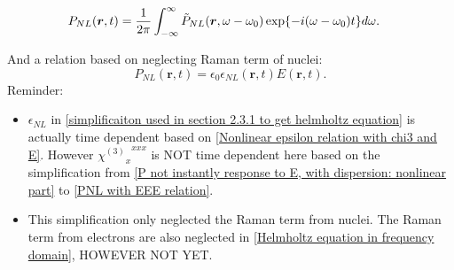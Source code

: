 \documentclass[12pt]{extarticle}
\numberwithin{equation}{section}
\numberwithin{figure}{section}
\numberwithin{table}{section}
\newcommand{\<}{\langle}
\renewcommand{\>}{\rangle}
\theoremstyle{definition}
\newcommand{\SubItem}[1]{
    {\setlength\itemindent{15pt} \item[-] #1}
}
\begin{document}
\begin{itemize}
{\begin{subequations}
\begin{align}
                        &P_{NL}(\boldsymbol{r},t)=\frac{1}{2\pi}\int_{-\infty}^{\infty}\Tilde{P}_{NL}(\boldsymbol{r},\omega-\omega_0)\exp{-i(\omega-\omega_0)t}d\omega. \label{inverse fourier transform of slow oscillating term of PNL}
                    \end{align}
                    \end{subequations}
                    }
                    \SubItem{
                    And a relation based on neglecting Raman term of nuclei:
                    \begin{equation}
                        P_{NL}(\boldsymbol{r},t)= \epsilon_0 \epsilon_{NL}(\boldsymbol{r},t) E(\boldsymbol{r},t).
                    \label{simplificaiton used in section 2.3.1 to get helmholtz equation}
                    \end{equation}
                    Reminder: 
                    \begin{itemize}
                        \item $\epsilon_{NL}$ in \autoref{simplificaiton used in section 2.3.1 to get helmholtz equation} is actually time dependent based on \autoref{Nonlinear epsilon relation with chi3 and E}. However ${{\chi^{(3)}}_x}^{xxx}$ is NOT time dependent here based on the simplification from \autoref{P not instantly response to E, with dispersion: nonlinear part} to \autoref{PNL with EEE relation}.
                        \item This simplification only neglected the Raman term from nuclei. The Raman term from electrons are also neglected in \autoref{Helmholtz equation in frequency domain}, HOWEVER NOT YET. 
                    \end{itemize}
                    }
                    

\end{itemize}
\end{document}

